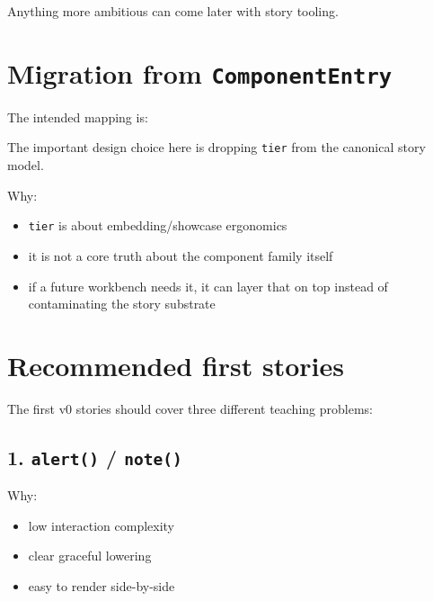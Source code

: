 Anything more ambitious can come later with story tooling.

\section{\texorpdfstring{Migration from \texttt{C\allowbreak{}o\allowbreak{}m\allowbreak{}p\allowbreak{}o\allowbreak{}n\allowbreak{}e\allowbreak{}n\allowbreak{}t\allowbreak{}E\allowbreak{}n\allowbreak{}t\allowbreak{}r\allowbreak{}y}}{Migration from }}\label{record-039-migration-from-componententry}

The intended mapping is:



The important design choice here is dropping \texttt{t\allowbreak{}i\allowbreak{}e\allowbreak{}r} from the canonical story model.

Why:

\begin{itemize}
\tightlist
\item
  \texttt{t\allowbreak{}i\allowbreak{}e\allowbreak{}r} is about embedding/showcase ergonomics
\item
  it is not a core truth about the component family itself
\item
  if a future workbench needs it, it can layer that on top instead of contaminating the story substrate
\end{itemize}

\section{Recommended first stories}\label{record-039-recommended-first-stories}

The first v0 stories should cover three different teaching problems:

\subsection{\texorpdfstring{1. \texttt{a\allowbreak{}l\allowbreak{}e\allowbreak{}r\allowbreak{}t\allowbreak{}(\allowbreak{})} / \texttt{n\allowbreak{}o\allowbreak{}t\allowbreak{}e\allowbreak{}(\allowbreak{})}}{1.  / }}\label{record-039-alert-note}

Why:

\begin{itemize}
\tightlist
\item
  low interaction complexity
\item
  clear graceful lowering
\item
  easy to render side-by-side
\end{itemize}

